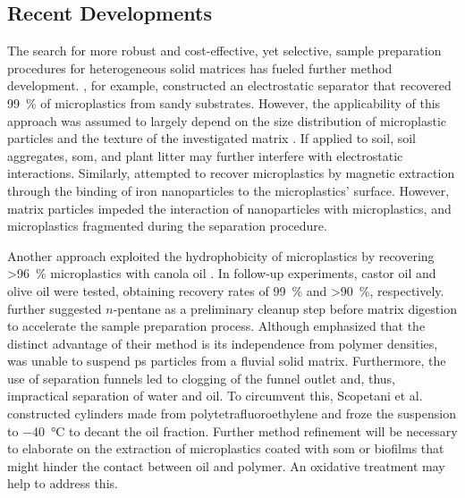 \subsection{Recent Developments}
\label{sec:analytical-techniques:recent-developments}

The search for more robust and cost-effective, yet selective, sample preparation procedures for heterogeneous solid matrices has fueled further method development. \citet{FelsingNew2018}, for example,
constructed an electrostatic separator that recovered \SI{99}{\percent} of microplastics from sandy substrates. However, the applicability of this approach was assumed to largely depend on the size distribution of microplastic particles and the texture of the investigated matrix \citep{EndersEvaluation2020}. If applied to soil, soil aggregates, \ac{som},
and plant litter may further interfere with electrostatic interactions.
Similarly, \citet{GrbicMagnetic2019} attempted to recover microplastics by magnetic extraction through the binding of iron nanoparticles to the microplastics' surface. However, matrix particles impeded the interaction of nanoparticles with microplastics, and microplastics fragmented during the separation procedure.

Another approach exploited the hydrophobicity of microplastics by recovering \SI{>96}{\percent} microplastics with canola oil \citep{CrichtonNovel2017}. In follow-up experiments, castor oil \citep{ManiUsing2019} and olive oil \citep{ScopetaniOlive2020} were tested,
obtaining recovery rates of \SI{99}{\percent} and \SI{>90}{\percent},
respectively. \citet{EndersEvaluation2020} further suggested $n$-pentane as a preliminary cleanup step before matrix digestion to accelerate the sample preparation process. Although \citet{ScopetaniOlive2020} emphasized that the distinct advantage of their method is its independence from polymer densities, \citet{ManiUsing2019} was unable to suspend \ac{ps} particles from a fluvial solid matrix. Furthermore, the use of separation funnels led to clogging of the funnel outlet and, thus, impractical separation of water and oil. To circumvent this, Scopetani et al. \citet{ScopetaniOlive2020} constructed cylinders made from polytetrafluoroethylene and froze the suspension to \SI{-40}{\degreeCelsius} to decant the oil fraction. Further method refinement will be necessary to elaborate on the extraction of microplastics coated with \ac{som} or biofilms that might hinder the contact between oil and polymer. An oxidative treatment may help to address this.

